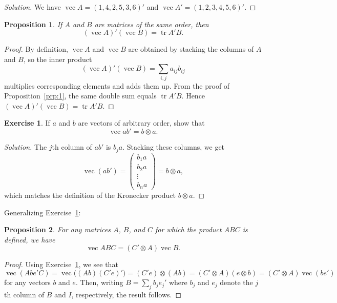 \documentclass[14pt]{extarticle}
\theoremstyle{plain}
\newtheorem{proposition}{Proposition}
\theoremstyle{definition}
\newtheorem{exercise}{Exercise}
\theoremstyle{remark}
\newenvironment{solution}{%
  \begin{proof}[Solution]%
}{%
  \end{proof}%
}
\DeclareMathOperator{\tr}{tr}
\DeclareMathOperator{\avec}{vec}
\begin{document}
\begin{solution}
We have $\avec A = (1, 4, 2, 5, 3, 6)'$ and $\avec A' = (1, 2, 3, 4, 5, 6)'$.
\end{solution}

\begin{proposition}\label{prp:5}
If $A$ and $B$ are matrices of the same order, then
\[
(\avec A)'(\avec B) = \tr A'B.
\]
\end{proposition}

\begin{proof}
By definition, $\avec A$ and $\avec B$ are obtained by stacking the columns of $A$ and $B$, so the inner product
\[
(\avec A)'(\avec B) = \sum_{i,j} a_{ij} b_{ij}
\]
multiplies corresponding elements and adds them up. From the proof of Proposition~\ref{prp:1}, the same double sum equals $\tr A'B$. Hence $(\avec A)'(\avec B) = \tr A'B$.
\end{proof}

\begin{exercise}\label{exer:3}
If $a$ and $b$ are vectors of arbitrary order, show that
\[
\avec ab' = b \otimes a.
\]
\end{exercise}

\begin{solution}
The $j$th column of $ab'$ is $b_j a$. Stacking these columns, we get
\[
\avec(ab') = \begin{pmatrix} b_1 a \\ b_2 a \\ \vdots \\ b_n a \end{pmatrix} = b \otimes a,
\]
which matches the definition of the Kronecker product $b \otimes a$.
\end{solution}

Generalizing Exercise~\ref{exer:3}:

\begin{proposition}\label{prp:6}
For any matrices $A$, $B$, and $C$ for which the product $ABC$ is defined, we have
\[
\avec ABC = (C' \otimes A) \avec B.
\]
\end{proposition}

\begin{proof}
Using Exercise~\ref{exer:3}, we see that
\[
\avec(Abe'C) = \avec\bigl((Ab)(C'e)'\bigr) = (C'e) \otimes (Ab)
= (C' \otimes A)(e \otimes b) = (C' \otimes A) \avec(be')
\]
for any vectors $b$ and $e$. Then, writing $B = \sum_j b_j e_j'$ where $b_j$ and $e_j$ denote the $j$th column of $B$ and $I$, respectively, the result follows.
\end{proof}
\end{document}
